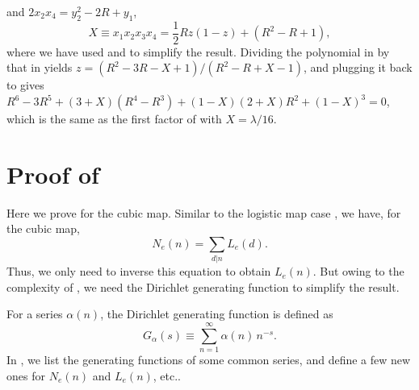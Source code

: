 \documentclass[preprint]{revtex4-1}
\begin{document}
and $2 x_2 x_4 = y_2^2 - 2 R + y_1$,
%
\begin{equation}
  X \equiv x_1 x_2 x_3 x_4 = \frac{1}{2} R z(1 - z) + (R^2 - R + 1),
\label{eq:der4}
\end{equation}
where we have used  and  to simplify the result.
%
Dividing the polynomial in  by that in 
yields $z = (R^2-3R-X+1)/(R^2-R+X-1)$,
and plugging it back to  gives
   $R^6 -3 R^5
  + (3 + X) (R^4 - R^3)
  + (1 - X) (2 + X) R^2
  + (1 - X)^3 = 0$,
which is the same as the first factor of 
  with $X = \lambda/16$.










\section{\label{apd:cublyndon}Proof of }

Here we prove  
  for the cubic map.
%
Similar to the logistic map case ,
  we have, for the cubic map,
\[
  N_e(n) = \sum_{d|n} L_e(d).
\]
Thus, we only need to inverse this equation to obtain $L_e(n)$.
But owing to the complexity of ,
  we need the Dirichlet generating function
  to simplify the result.

For a series $\alpha(n)$,
the Dirichlet generating function is defined as
\[
    G_\alpha(s) \equiv \sum_{n=1}^\infty \alpha(n) \, n^{-s}.
\]
In , we list the generating functions of
some common series,
and define a few new ones for $N_e(n)$ and $L_e(n)$, etc..
\end{document}
